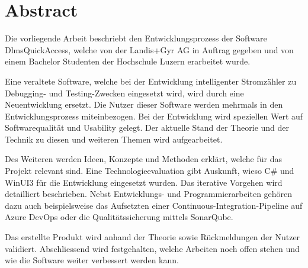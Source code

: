 \begingroup
\let\clearpage\relax
\let\cleardoublepage\relax
\let\cleardoublepage\relax

\cleardoublepage


\chapter*{Abstract}
Die vorliegende Arbeit beschriebt den Entwicklungsprozess der Software \dq DlmsQuickAccess\dq, welche von der Landis+Gyr AG in Auftrag gegeben und von einem Bachelor Studenten der Hochschule Luzern erarbeitet wurde.

Eine veraltete Software, welche bei der Entwicklung intelligenter Stromzähler zu Debugging- und Testing-Zwecken eingesetzt wird, wird durch eine Neuentwicklung ersetzt.
Die Nutzer dieser Software werden mehrmals in den Entwicklungsprozess miteinbezogen.
Bei der Entwicklung wird speziellen Wert auf Softwarequalität und Usability gelegt.
Der aktuelle Stand der Theorie und der Technik zu diesen und weiteren Themen wird aufgearbeitet.

Des Weiteren werden Ideen, Konzepte und Methoden erklärt, welche für das Projekt relevant sind.
Eine Technologieevaluation gibt Auskunft, wieso C\# und WinUI3 für die Entwicklung eingesetzt wurden.
Das iterative Vorgehen wird detailliert beschrieben.
Nebst Entwicklungs- und Programmierarbeiten gehören dazu auch beispielsweise das Aufsetzten einer Continuous-Integration-Pipeline auf Azure DevOps oder die Qualitätssicherung mittels SonarQube.

Das erstellte Produkt wird anhand der Theorie sowie Rückmeldungen der Nutzer validiert.
Abschliessend wird festgehalten, welche Arbeiten noch offen stehen und wie die Software weiter verbessert werden kann.
\endgroup

\vfill

